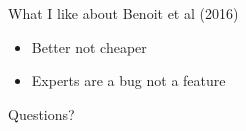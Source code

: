 \documentclass[aspectratio=169]{beamer}
\begin{document}
\begin{frame}

\begin{center}
\end{center}

\end{frame}
\begin{frame}

What I like about Benoit et al (2016)
\begin{itemize}
\item Better not cheaper
\pause
\item Experts are a bug not a feature
\end{itemize}

\end{frame}
\begin{frame}

{\Large
\begin{center}
Questions?
\end{center}
}

\end{frame}
\end{document}
